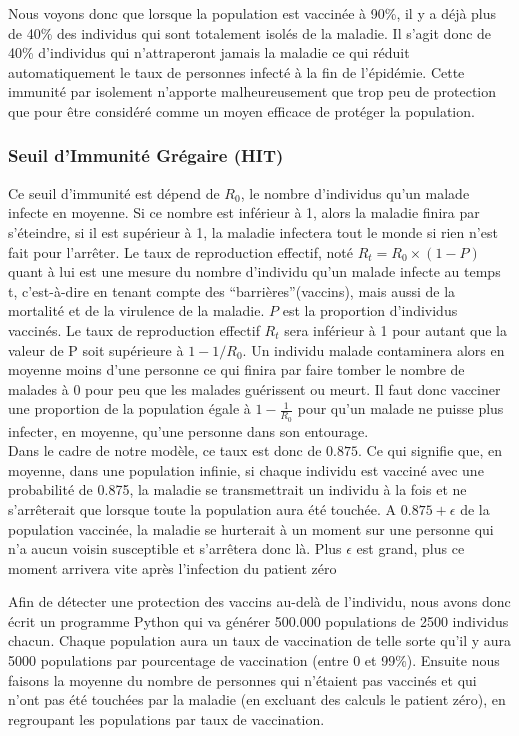 \documentclass[journal, a4paper]{IEEEtran}
\begin{document}
	Nous voyons donc que lorsque la population est vaccinée à 90\%, il y a déjà plus de 40\% des individus qui sont totalement isolés de la maladie. Il s'agit donc de 40\% d'individus qui n'attraperont jamais la maladie ce qui réduit automatiquement le taux de personnes infecté à la fin de l'épidémie. Cette immunité par isolement n'apporte malheureusement que trop peu de protection que pour être considéré comme un moyen efficace de protéger la population.

	\subsubsection{Seuil d'Immunité Grégaire (HIT)}
	Ce seuil d'immunité est dépend de $R_0$, le nombre d'individus qu'un malade infecte en moyenne. Si ce nombre est inférieur à 1, alors la maladie finira par s'éteindre, si il est supérieur à 1, la maladie infectera tout le monde si rien n'est fait pour l'arrêter.
	Le taux de reproduction effectif, noté $R_t = R_0 \times (1-P)$ quant à lui est une mesure du nombre d'individu qu'un malade infecte au temps t, c'est-à-dire en tenant compte des ``barrières''(vaccins), mais aussi de la mortalité et de la virulence de la maladie. $P$ est la proportion d'individus vaccinés. Le taux de reproduction effectif $R_t$ sera inférieur à 1 pour autant que la valeur de P soit supérieure à $1-1/R_0$. Un individu malade contaminera alors en moyenne moins d'une personne ce qui finira par faire tomber le nombre de malades à 0 pour peu que les malades guérissent ou meurt. Il faut donc vacciner une proportion de la population égale à $1-\frac{1}{R_0}$ pour qu'un malade ne puisse plus infecter, en moyenne, qu'une personne dans son entourage.\\
	Dans le cadre de notre modèle, ce taux est donc de $0.875$. Ce qui signifie que, en moyenne, dans une population infinie, si chaque individu est vacciné avec une probabilité de 0.875, la maladie se transmettrait un individu à la fois et ne s'arrêterait que lorsque toute la population aura été touchée. A $0.875+\epsilon$ de la population vaccinée, la maladie se hurterait à un moment sur une personne qui n'a aucun voisin susceptible et s'arrêtera donc là. Plus $\epsilon$ est grand, plus ce moment arrivera vite après l'infection du patient zéro

	Afin de détecter une protection des vaccins au-delà de l'individu, nous avons donc écrit un programme Python qui va générer 500.000 populations de 2500 individus chacun. Chaque population aura un taux de vaccination de telle sorte qu'il y aura 5000 populations par pourcentage de vaccination (entre 0 et 99\%). Ensuite nous faisons la moyenne du nombre de personnes qui n'étaient pas vaccinés et qui n'ont pas été touchées par la maladie (en excluant des calculs le patient zéro), en regroupant les populations par taux de vaccination.
\end{document}
